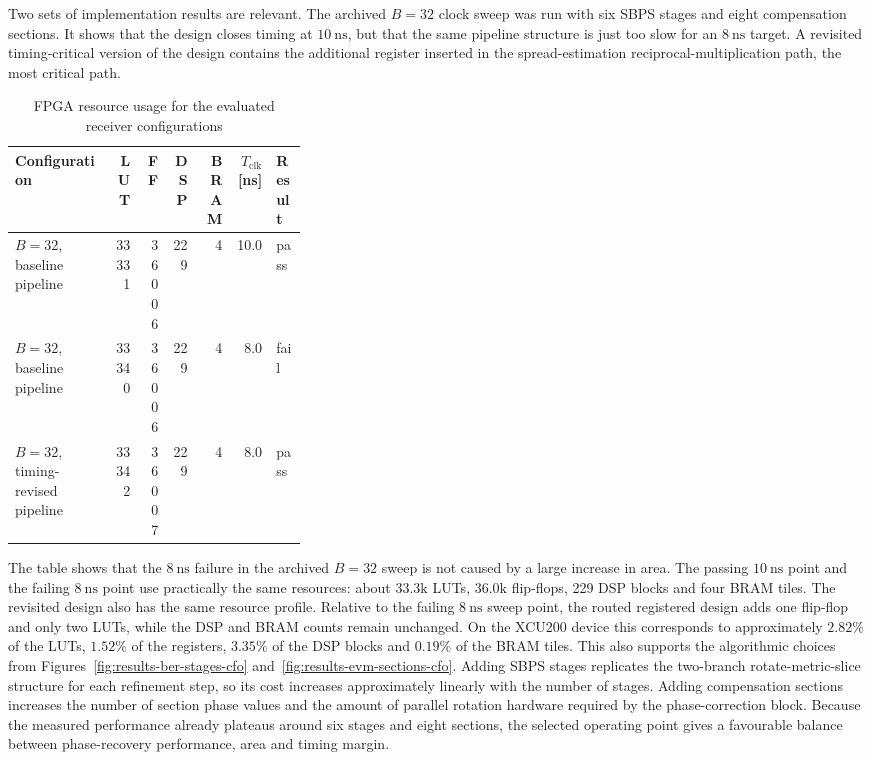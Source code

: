 Two sets of implementation results are relevant. The archived \(B=32\) clock sweep was run with six \ac{SBPS} stages and eight compensation sections. It shows that the design closes timing at \(10~\mathrm{ns}\), but that the same pipeline structure is just too slow for an \(8~\mathrm{ns}\) target. A revisited timing-critical version of the design contains the additional register inserted in the spread-estimation reciprocal-multiplication path, the most critical path.
\begin{table}[H]
\centering
\caption{FPGA resource usage for the evaluated receiver configurations}
\label{tab:results-resource-usage}
\small
\begin{tabular}{p{0.34\linewidth} r r r r r l}
\hline
Configuration & LUT & FF & DSP & BRAM & \(T_{\mathrm{clk}}\) [ns] & Result \\
\hline
\(B=32\), baseline pipeline & 33331 & 36006 & 229 & 4 & 10.0 & pass \\
\(B=32\), baseline pipeline & 33340 & 36006 & 229 & 4 & 8.0 & fail \\
\(B=32\), timing-revised pipeline & 33342 & 36007 & 229 & 4 & 8.0 & pass \\
\hline
\end{tabular}
\end{table}

The table shows that the \(8~\mathrm{ns}\) failure in the archived \(B=32\) sweep is not caused by a large increase in area. The passing \(10~\mathrm{ns}\) point and the failing \(8~\mathrm{ns}\) point use practically the same resources: about \(33.3\mathrm{k}\) LUTs, \(36.0\mathrm{k}\) flip-flops, 229 DSP blocks and four BRAM tiles. The revisited design also has the same resource profile. Relative to the failing \(8~\mathrm{ns}\) sweep point, the routed registered design adds one flip-flop and only two LUTs, while the DSP and BRAM counts remain unchanged. On the XCU200 device this corresponds to approximately \(2.82\%\) of the LUTs, \(1.52\%\) of the registers, \(3.35\%\) of the DSP blocks and \(0.19\%\) of the BRAM tiles.
This also supports the algorithmic choices from Figures~\ref{fig:results-ber-stages-cfo} and~\ref{fig:results-evm-sections-cfo}. Adding \ac{SBPS} stages replicates the two-branch rotate-metric-slice structure for each refinement step, so its cost increases approximately linearly with the number of stages. Adding compensation sections increases the number of section phase values and the amount of parallel rotation hardware required by the phase-correction block. Because the measured performance already plateaus around six stages and eight sections, the selected operating point gives a favourable balance between phase-recovery performance, area and timing margin.

